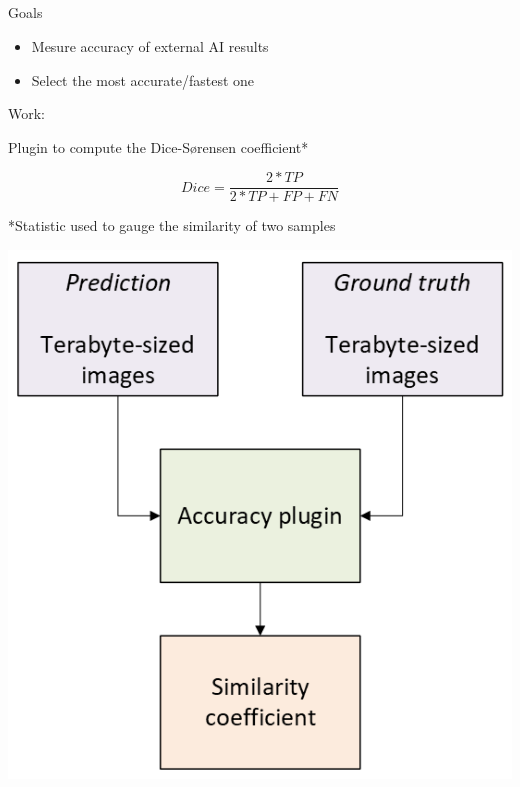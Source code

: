 \subsection{\slidetitle}
\begin{frame}
  \frametitle{\sectiontitle}
  \framesubtitle{\slidetitle}

  \begin{minipage}[h!]{0.65\textwidth}

    Goals
    \begin{itemize}
      \item Mesure accuracy of external AI results
      \item Select the most accurate/fastest one
    \end{itemize}

    \bigskip

    Work:

    Plugin to compute the Dice-Sørensen coefficient*

    \[ Dice = \frac{2*TP}{2*TP + FP + FN} \]

    \bigskip
    \bigskip

    *Statistic used to gauge the similarity of two samples
  \end{minipage}\hfill
  \begin{minipage}[h!]{0.35\textwidth}
    \includegraphics[scale=0.55]{./img/2_ai-plugins/accuracy.png}
  \end{minipage}
\end{frame}
